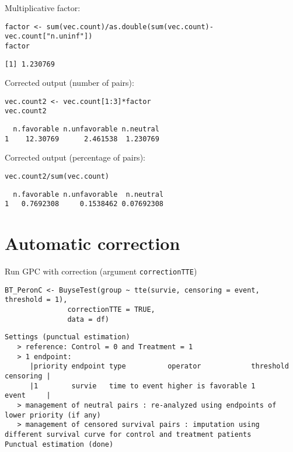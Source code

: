 \documentclass{article}
\begin{document}
Multiplicative factor:
\lstset{language=r,label= ,caption= ,captionpos=b,numbers=none}
\begin{lstlisting}
factor <- sum(vec.count)/as.double(sum(vec.count)-vec.count["n.uninf"])
factor
\end{lstlisting}

\begin{verbatim}
[1] 1.230769
\end{verbatim}

Corrected output (number of pairs):
\lstset{language=r,label= ,caption= ,captionpos=b,numbers=none}
\begin{lstlisting}
vec.count2 <- vec.count[1:3]*factor
vec.count2
\end{lstlisting}

\begin{verbatim}
  n.favorable n.unfavorable n.neutral
1    12.30769      2.461538  1.230769
\end{verbatim}

Corrected output (percentage of pairs):
\lstset{language=r,label= ,caption= ,captionpos=b,numbers=none}
\begin{lstlisting}
vec.count2/sum(vec.count)
\end{lstlisting}

\begin{verbatim}
  n.favorable n.unfavorable  n.neutral
1   0.7692308     0.1538462 0.07692308
\end{verbatim}

\clearpage

\section{Automatic correction}
\label{sec:orgcc84a18}

Run GPC with correction (argument \texttt{correctionTTE})
\lstset{language=r,label= ,caption= ,captionpos=b,numbers=none}
\begin{lstlisting}
BT_PeronC <- BuyseTest(group ~ tte(survie, censoring = event, threshold = 1),
		       correctionTTE = TRUE,                      
		       data = df)
\end{lstlisting}

\begin{verbatim}
Settings (punctual estimation) 
   > reference: Control = 0 and Treatment = 1
   > 1 endpoint: 
      |priority endpoint type          operator            threshold censoring |
      |1        survie   time to event higher is favorable 1         event     |
   > management of neutral pairs : re-analyzed using endpoints of lower priority (if any) 
   > management of censored survival pairs : imputation using different survival curve for control and treatment patients 
Punctual estimation (done)
\end{verbatim}
\end{document}
